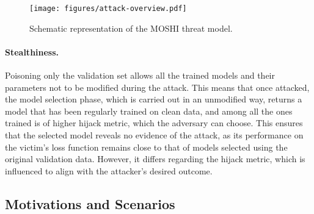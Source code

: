 \begin{figure*}[!htpb]
    \centering
    \texttt{[image: figures/attack-overview.pdf]}
    \caption{Schematic representation of the MOSHI threat model.}
    \label{fig:overview}
\end{figure*}

\paragraph{Stealthiness.}
Poisoning only the validation set allows all the trained models and their parameters not to be modified during the attack.
This means that once attacked, the model selection phase, which is carried out in an unmodified way, returns a model that has been regularly trained on clean data, and among all the ones trained is of higher hijack metric, which the adversary can choose.
This ensures that the selected model reveals no evidence of the attack, as its performance on the victim's loss function remains close to that of models selected using the original validation data.
However, it differs regarding the hijack metric, which is influenced to align with the attacker’s desired outcome.

\subsection{Motivations and Scenarios}
\label{subsec:motivation}

